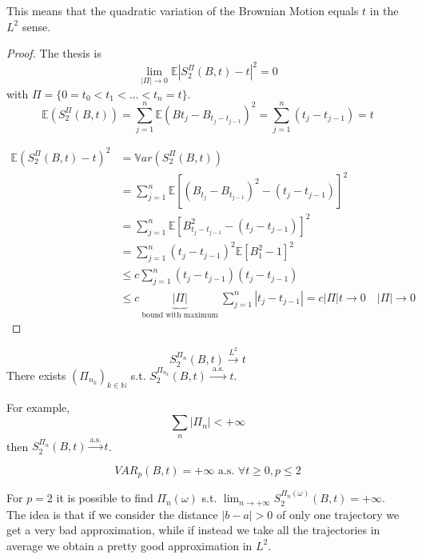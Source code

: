 \documentclass[crop=false, class=article]{standalone}
\begin{document}
This means that the quadratic variation of the Brownian Motion equals $t$ in the $L^2$ sense. 
\begin{proof}
	The thesis is 
	\begin{equation*}
		\lim_{|\Pi| \rightarrow 0} \mathbb{E}|S_2^\Pi(B,t) - t|^2 = 0
	\end{equation*}
	with $\Pi = \{0 = t_0 < t_1 < \ldots < t_n = t\}$.
	\begin{equation*}
		\mathbb{E}(S_2^\Pi(B,t)) = \sum_{j=1}^n \mathbb{E}(B{t_j} - B_{t_j-t_{j-1}})^2 = \sum_{j=1}^n(t_j-t_{j-1}) = t
	\end{equation*}
	
	\begin{align*}
		\mathbb{E}(S_2^\Pi(B,t)-t)^2 &= \mathbb{V}ar(S_2^\Pi(B,t)) \\
		&= \sum_{j=1}^{n} \mathbb{E} [(B_{t_j} - B_{t_{j-1}})^2 - (t_j - t_{j-1})]^2 \\
		&= \sum_{j=1}^{n} \mathbb{E} [B^2_{t_j - t_{j-1}} - (t_j - t_{j-1})]^2 \\
		&= \sum_{j=1}^{n} (t_j - t_{j-1})^2 \mathbb{E} [B_1^2 - 1]^2 \\
		&\leq c \sum_{j=1}^{n} (t_j - t_{j-1}) (t_j - t_{j-1}) \\
		& \leq c \underbrace{|\Pi| }_{\text{ bound with maximum }} \sum_{j=1}^{n} |t_j - t_{j-1}| = c |\Pi| t \rightarrow 0 \quad |\Pi| \rightarrow 0
	\end{align*}
\end{proof}
\begin{proposition}
	\begin{equation*}
		S_2^{\Pi_n}(B,t) \xrightarrow{L^2} t
	\end{equation*}
	There exists $(\Pi_{n_k})_{k \in \mathbb{N}}$ s.t. $S_2^{\Pi_{n_k}} (B,t) \xrightarrow{ \text{ a.s. }} t$.
\end{proposition}
For example, 
\begin{equation*}
	\sum_n |\Pi_n| < +\infty
\end{equation*}
then $S_2^{\Pi_n}(B,t) \xrightarrow{ \text{a.s.}} t$.
\begin{proposition}
	\begin{equation*}
		VAR_p(B,t) = +\infty \text{  a.s. } \forall t \geq 0, p \leq 2
	\end{equation*}
\end{proposition}
For $p=2$ it is possible to find $\Pi_n(\omega)$ s.t. $\lim_{n\rightarrow +\infty} S_2^{\Pi_n(\omega)} (B,t) = +\infty$.\\
The idea is that if we consider the distance $|b-a| > 0$ of only one trajectory we get a very bad approximation, while if instead we take all the trajectories in average we obtain a pretty good approximation in  $L^2$. 
\end{document}
